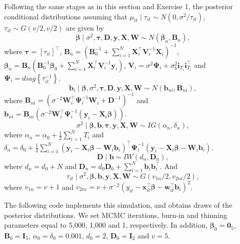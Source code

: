 Following the same stages as in this section and Exercise 1, the posterior conditional distributions assuming that $\mu_{it}\mid \tau_{it}\sim N(0, \sigma^2/\tau_{it})$, $\tau_{it}\sim G(v/2,v/2)$ are given by 
\begin{equation*}
	\bm{\beta}\mid \sigma^2,\bm{\tau},\bm{D},\bm{y}, \bm{X}, \bm{W} \sim {N}(\bm{\beta}_n,\bm{B}_n), 
\end{equation*}
where $\bm{\tau}=[\tau_{it}]^{\top}$, $\bm{B}_n = (\bm{B}_0^{-1} +\sum_{i=1}^N \bm{X}_i^{\top}\bm{V}_i^{-1}\bm{X}_i)^{-1}$, $\bm{\beta}_n= \bm{B}_n(\bm{B}_0^{-1}\bm{\beta}_0 + \sum_{i=1}^N\bm{X}_i^{\top}\bm{V}_i^{-1}\bm{y}_i)$, $\bm{V}_i=\sigma^2\bm{\Psi}_i+\sigma_{b}^2\bm{i}_{T_i}\bm{i}_{T_i}^{\top}$ and $\bm{\Psi}_i=diag\left\{\tau_{it}^{-1}\right\}$.
\begin{equation*}
	\bm{b}_i\mid \bm{\beta},\sigma^2,\bm{\tau},\bm{D},\bm{y}, \bm{X}, \bm{W} \sim {N}(\bm{b}_{ni},\bm{B}_{ni}), 
\end{equation*} 
where $\bm{B}_{ni}=(\sigma^{-2}\bm{W}_i^{\top}\bm{\Psi}_i^{-1}\bm{W}_i+\bm{D}^{-1})^{-1}$ and $\bm{b}_{ni}=\bm{B}_{ni}(\sigma^{-2}\bm{W}_i^{\top}\bm{\Psi}_i^{-1}(\bm{y}_i-\bm{X}_i\bm{\beta}))$.
\begin{equation*}
	\sigma^2\mid  \bm{\beta}, \bm{b}, \bm{\tau}, \bm{y}, \bm{X}, \bm{W} \sim {I}{G}(\alpha_n, \delta_n),
\end{equation*}
where $\alpha_n=\alpha_0+\frac{1}{2}\sum_{i=1}^N T_i$ and $\delta_n=\delta_0+\frac{1}{2}\sum_{i=1}^N(\bm{y}_i-\bm{X}_i\bm{\beta}-\bm{W}_i\bm{b}_i)^{\top}\bm{\Psi}_i^{-1}(\bm{y}_i-\bm{X}_i\bm{\beta}-\bm{W}_i\bm{b}_i)$.  
\begin{equation*}
	\bm{D}\mid  \bm{b} \sim {I}{W}(d_n, \bm{D}_n),
\end{equation*}
where $d_n=d_0+N$ and $\bm{D}_n=d_0\bm{D}_0+\sum_{i=1}^N\bm{b}_i\bm{b}_i^{\top}$. And
\begin{equation*}
	\tau_{it}\mid \sigma^2, \bm{\beta}, \bm{b}, \bm{y}, \bm{X}, \bm{W} \sim {G}(v_{1n}/2, v_{2ni}/2),
\end{equation*}
where $v_{1n}=v+1$ and $v_{2ni}=v+\sigma^{-2}(y_{it}-\bm{x}_{it}^{\top}\bm{\beta}-\bm{w}_{it}^{\top}\bm{b}_i)^2$.

The following code implements this simulation, and obtains draws of the posterior distributions. We set MCMC iterations, burn-in and thinning parameters equal to 5,000, 1,000 and 1, respectively. In addition, $\bm{\beta}_0=\bm{0}_5$, $\bm{B}_0=\bm{I}_5$, $\alpha_0=\delta_0=0.001$, $d_0=2$, $\bm{D}_0=\bm{I}_2$ and $v=5$.

